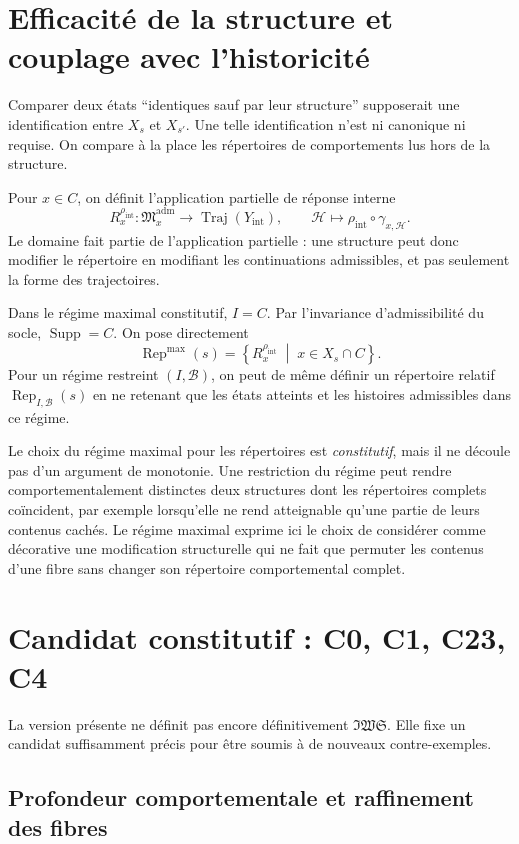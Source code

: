 \documentclass[11pt,a4paper]{article}
\theoremstyle{definition}
\theoremstyle{remark}
\newcommand{\IWS}{\mathfrak{IWS}}
\newcommand{\Madm}{\mathfrak M^{\mathrm{adm}}}
\newcommand{\Supp}{\operatorname{Supp}}
\newcommand{\Rep}{\operatorname{Rep}}
\begin{document}
\section{Efficacité de la structure et couplage avec l'historicité}

Comparer deux états ``identiques sauf par leur structure'' supposerait une identification entre $X_s$ et $X_{s'}$. Une telle identification n'est ni canonique ni requise. On compare à la place les répertoires de comportements lus hors de la structure.

Pour $x\in C$, on définit l'application partielle de réponse interne
\[
R_x^{\rho_{\mathrm{int}}}:\Madm_x\longrightarrow
\operatorname{Traj}(Y_{\mathrm{int}}),
\qquad
\mathcal H\longmapsto
\rho_{\mathrm{int}}\circ\gamma_{x,\mathcal H}.
\]
Le domaine fait partie de l'application partielle : une structure peut donc modifier le répertoire en modifiant les continuations admissibles, et pas seulement la forme des trajectoires.

Dans le régime maximal constitutif, $I=C$. Par l'invariance d'admissibilité du socle, $\Supp=C$. On pose directement
\[
\boxed{
\Rep^{\max}(s)=
\left\{
R_x^{\rho_{\mathrm{int}}}
\;\middle|\;
 x\in X_s\cap C
\right\}.}
\]
Pour un régime restreint $(I,\mathcal B)$, on peut de même définir un répertoire relatif $\Rep_{I,\mathcal B}(s)$ en ne retenant que les états atteints et les histoires admissibles dans ce régime.

Le choix du régime maximal pour les répertoires est \emph{constitutif}, mais il ne découle pas d'un argument de monotonie. Une restriction du régime peut rendre comportementalement distinctes deux structures dont les répertoires complets coïncident, par exemple lorsqu'elle ne rend atteignable qu'une partie de leurs contenus cachés. Le régime maximal exprime ici le choix de considérer comme décorative une modification structurelle qui ne fait que permuter les contenus d'une fibre sans changer son répertoire comportemental complet.

\section{Candidat constitutif : C0, C1, C23, C4}

La version présente ne définit pas encore définitivement $\IWS$. Elle fixe un candidat suffisamment précis pour être soumis à de nouveaux contre-exemples.

\subsection{Profondeur comportementale et raffinement des fibres}
\end{document}
